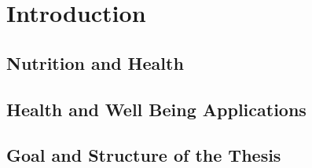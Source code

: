
\chapter{Introduction}\label{chapter:introduction}

\section{Nutrition and Health}
\section{Health and Well Being Applications}
\section{Goal and Structure of the Thesis}
